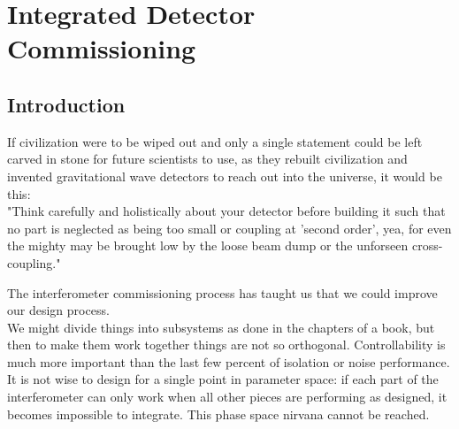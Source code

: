 \chapter[Integrated Detector Commissioning]{Integrated Detector Commissioning}
\label{IDC}




\section{Introduction}
\label{sec7.1}
If civilization were to be wiped out and only a single statement could be left
carved in stone for future scientists to use, as they rebuilt civilization and
invented gravitational wave detectors to reach out into the universe,
it would be this:\\

"Think carefully and holistically about your detector before building it
such that no part is neglected as being too small or  coupling at 'second order',
yea, for even the mighty may be brought low by the loose beam dump or the
unforseen cross-coupling."

The interferometer commissioning process has taught us that we could improve
our design process.\\

We might divide things into subsystems as done in the chapters of a book,
but then to make them work together things are not so orthogonal.
Controllability is much more important than the last few percent of
isolation or noise performance.\\

It is not wise to design for a single point in parameter space: if each
part of the interferometer can only work when all other pieces are
performing as designed, it becomes impossible to integrate. This phase
space nirvana cannot be reached. \\

